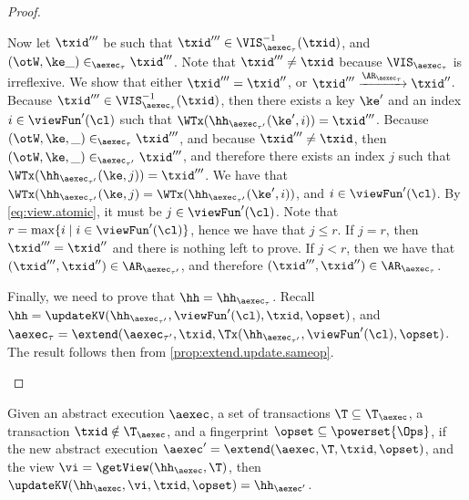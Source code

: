 \begin{proof}
\begin{itemize}
\begin{itemize}
Now let $\txid'''$ be such that $\txid''' \in \VIS^{-1}_{\aexec_{\tau}}(\txid)$, and $(\otW, \ke \_) \in_{\aexec_{\tau}} \txid'''$. 
Note that $\txid''' \neq \txid$ because $\VIS_{\aexec_{\tau}}$ is irreflexive.
We show that either $\txid''' = \txid''$, or $\txid''' \xrightarrow{\AR_{\aexec_{\tau}}} \txid''$. 
Because $\txid''' \in \VIS^{-1}_{\aexec_{\tau}}(\txid)$, then there exists a key $\ke'$ and an index $i \in \viewFun'(\cl)$ 
such that $\WTx(\hh_{\aexec_{\tau'}}(\ke', i)) = \txid'''$. Because $(\otW, \ke, \_) \in_{\aexec_{\tau}} \txid'''$, 
and because $\txid''' \neq \txid$, then $(\otW, \ke, \_) \in_{\aexec_{\tau'}} \txid'''$, and therefore there exists 
an index $j$ such that $\WTx(\hh_{\aexec_{\tau'}}(\ke, j)) = \txid'''$. We have that $\WTx(\hh_{\aexec_{\tau'}}(\ke, j) = 
\WTx(\hh_{\aexec_{\tau'}}(\ke', i))$, and $i \in \viewFun'(\cl)$. By \cref{eq:view.atomic}, it must be $j \in \viewFun'(\cl)$. 
Note that $r = \max\{i \mid i \in \viewFun'(\cl)\}$, hence we have that $j \leq r$. If $j = r$, then $\txid''' = \txid''$ and 
there is nothing left to prove. If $j < r$, then we have that $(\txid''', \txid'') \in \AR_{\aexec_{\tau'}}$, and 
therefore $(\txid''', \txid'') \in \AR_{\aexec_{\tau}}$.
\end{itemize}
Finally, we need to prove that $\hh = \hh_{\aexec_{\tau}}$.
Recall $\hh = \updateKV(\hh_{\aexec_{\tau'}}, \viewFun'(\cl), \txid, \opset)$, 
and $\aexec_{\tau} = \extend(\aexec_{\tau'}, \txid, \Tx(\hh_{\aexec_{\tau'}}, \viewFun'(\cl), \opset)$. 
The result follows then from \cref{prop:extend.update.sameop}. 
\end{itemize}
\end{proof}


\begin{proposition}
\label{prop:extend.update.sameop}
Given an abstract execution $\aexec$, a set of transactions $\T \subseteq \T_{\aexec}$,
a transaction $\txid \notin \T_{\aexec}$, and a fingerprint $\opset \subseteq \powerset{\Ops}$,
if the new abstract execution $\aexec' = \extend(\aexec, \T, \txid, \opset)$,
and the view $\vi = \getView(\hh_{\aexec}, \T)$,
then $\updateKV(\hh_{\aexec}, \vi, \txid, \opset) = \hh_{\aexec'}$.
\end{proposition}

